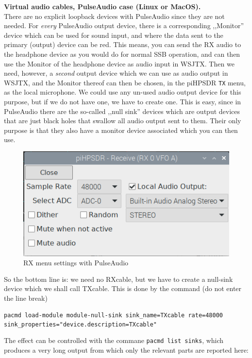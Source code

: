 \documentclass[12pt]{book}
\def\bltt#1{\texttt{\color{blue}#1}}
\begin{document}
\clearpage
\textbf{\color{red}Virtual audio cables, PulseAudio case (Linux or MacOS).}\\
There are no explicit loopback devices with PulseAudio since they are not needed.
For \textit{every} PulseAudio output device, there is a corresponding ,,Monitor'' device
which can be used for sound input, and where the data sent to the primary (output) device
can be red. This means, you can send the RX audio to the headphone device as you would do
for normal SSB operation, and can then use the Monitor of the headphone device as audio
input in WSJTX. Then we need, however, a \textit{second} output device which we can use
as audio  output in WSJTX, and the Monitor thereof can then be chosen, in the piHPSDR
\bltt{TX} menu, as the local microphone. We could use any un-used audio output device for
this purpose, but if we do not have one, we have to create one. This is easy, since
in PulseAudio there are the so-called ,,null sink'' devices which are output devices
that are just black holes that swallow all audio output sent to them. Their only purpose
is that they also have a monitor device associated which you can then use.

\begin{figure}[ht]
\center
\includegraphics[width=12cm]{rx_settings_pa_audio.png}
\caption{RX menu settings with PulseAudio}
\label{fig:rx_settings_pa_audio}
\end{figure}

So the bottom line is: we need no RXcable, but we have to create a null-sink device which
we shall call TXcable. This is done by the command (do not enter the line break)

\texttt{pacmd load-module module-null-sink sink\_name=TXcable rate=48000 \\
sink\_properties="device.description=TXcable"
}

The effect can be controlled with the commane \texttt{pacmd list sinks}, which produces
a very long output from which only the relevant parts are reported here:
\end{document}

